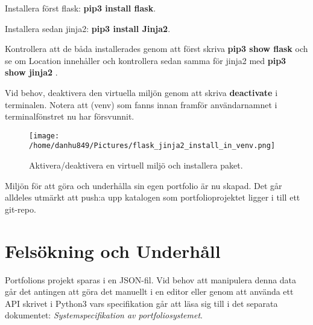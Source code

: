 \documentclass{TDP003mall}
\begin{document}
Installera först flask: \textbf{pip3 install flask}.

Installera sedan jinja2: \textbf{pip3 install Jinja2}.

Kontrollera att de båda installerades genom att först skriva \textbf{pip3 show flask} och se om Location innehåller  och kontrollera sedan samma för jinja2 med \textbf{pip3 show jinja2} .

Vid behov, deaktivera den virtuella miljön genom att skriva \textbf{deactivate} i terminalen. Notera att (venv) som fanns innan framför användarnamnet i terminalfönstret nu har försvunnit.

\begin{figure}[h]
  \centerline{\texttt{[image: /home/danhu849/Pictures/flask\_jinja2\_install\_in\_venv.png]}}
  \caption{Aktivera/deaktivera en virtuell miljö och installera paket.}
  \label{fig}
\end{figure}

\newpage

Miljön för att göra och underhålla sin egen portfolio är nu skapad. Det går alldeles utmärkt att push:a upp katalogen som portfolioprojektet ligger i till ett git-repo.


\section{Felsökning och Underhåll}
Portfolions projekt sparas i en JSON-fil. Vid behov att manipulera denna data går det antingen att göra det manuellt i en editor eller genom att använda ett API skrivet i Python3 vars specifikation går att läsa sig till i det separata dokumentet: \emph{Systemspecifikation av portfoliosystemet}.
\end{document}
